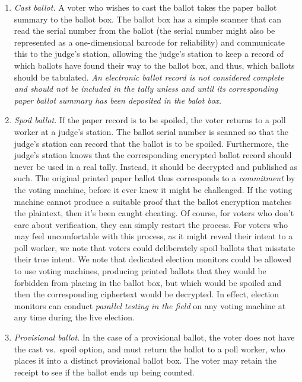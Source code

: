 \documentclass[letterpaper, 10pt, twocolumn]{article}
\begin{document}
\begin{enumerate}
\begin{enumerate}
\item  {\em Cast ballot.}
A voter who wishes to cast the ballot takes the paper ballot summary to the ballot box.
The ballot box has a simple scanner that can read the serial number from the ballot
(the serial number might also be represented as a one-dimensional barcode for reliability)
and communicate this to the judge's station, allowing the judge's station to keep a record of which ballots have found their way to the ballot box, and thus, which ballots should be tabulated. 
{\em An electronic ballot record is not considered complete and should not be
 included in the tally unless and until its corresponding paper ballot summary has
 been deposited in the balot box.}

\item {\em Spoil ballot.}
If the paper record is to be spoiled, the voter returns to a poll worker at a judge's station. 
The ballot serial number is scanned so that the judge's station can record that the ballot is to be spoiled. Furthermore, the judge's station knows that the corresponding encrypted ballot record should never be used in a real tally. 
Instead, it should be decrypted and published as such. 
The original printed paper ballot thus corresponds to a {\em commitment\/} by the voting machine, before it ever knew it might be challenged.
 If the voting machine cannot produce a suitable proof that the ballot encryption matches the plaintext,
 then it's been caught cheating.
 Of course, for voters who don't care about verification,
 they can simply restart the process.
 For voters who may feel uncomfortable with this process,
 as it might reveal their intent to a poll worker,
 we note that voters could deliberately spoil ballots that misstate their true intent. We note that dedicated election monitors could be allowed to use voting machines, producing printed ballots that they would be forbidden from placing in the ballot box, but which would be spoiled and then the corresponding ciphertext would be decrypted. In effect, election monitors can conduct {\em parallel testing in the field\/} on any voting machine at any time during the live election.


\item {\em Provisional ballot.}
In the case of a provisional ballot, the voter does not have the cast vs.~spoil option, and must return the ballot to a poll worker, who places it into a distinct provisional ballot box. The voter may retain the receipt to see if the ballot ends up being counted.
\end{enumerate}


\end{enumerate}
\end{document}

